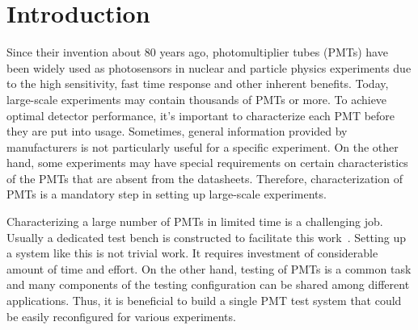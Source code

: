 \documentclass{nst}
\providecommand{\DIFadd}[1]{{\protect\color{yellow} #1}} %
\providecommand{\DIFaddbegin}{} %
\providecommand{\DIFaddend}{} %
\providecommand{\DIFdelbegin}{} %
\providecommand{\DIFdelend}{} %
\begin{document}

\maketitle


\section{Introduction}
\label{sec:introduction}

Since \DIFdelbegin \DIFdelend \DIFaddbegin \DIFadd{their invention }\DIFaddend about 80 years ago, photomultiplier tubes (PMTs) have been widely used as photosensors in nuclear and particle physics experiments due to the high sensitivity, fast time response and other \DIFdelbegin \DIFdelend \DIFaddbegin \DIFadd{inherent benefits}\DIFaddend . 
Today, \DIFdelbegin \DIFdelend \DIFaddbegin \DIFadd{large-scale }\DIFaddend experiments may contain thousands \DIFdelbegin \DIFdelend \DIFaddbegin \DIFadd{of PMTs or more. To achieve optimal detector }\DIFaddend performance, it's important to \DIFdelbegin \DIFdelend \DIFaddbegin \DIFadd{characterize }\DIFaddend each PMT before they are put into usage. 
\DIFdelbegin \DIFdelend %
\DIFaddbegin \DIFadd{Sometimes, general information provided by manufacturers is not particularly useful for a specific }\DIFaddend experiment.
On the other hand, \DIFdelbegin \DIFdelend \DIFaddbegin \DIFadd{some }\DIFaddend experiments may have special requirements \DIFdelbegin \DIFdelend \DIFaddbegin \DIFadd{on certain }\DIFaddend characteristics of the PMTs \DIFdelbegin \DIFdelend \DIFaddbegin \DIFadd{that are absent from the datasheets}\DIFaddend . 
Therefore, \DIFdelbegin \DIFdelend characterization of PMTs \DIFdelbegin \DIFdelend \DIFaddbegin \DIFadd{is a mandatory step in setting up large-scale }\DIFaddend experiments.

Characterizing a large number of PMTs in limited time is a \DIFdelbegin \DIFdelend \DIFaddbegin \DIFadd{challenging job. Usually }\DIFaddend a dedicated test bench is constructed to facilitate this work~\cite{barnhill_testing_2008,akgun_complete_2005,adragna_pmt-block_2006}.
Setting up a system like this is not \DIFdelbegin \DIFdelend \DIFaddbegin \DIFadd{trivial work. It requires investment of considerable amount of }\DIFaddend time and effort.
On the other hand, testing of PMTs is a \DIFdelbegin \DIFdelend \DIFaddbegin \DIFadd{common task }\DIFaddend and many components of the testing configuration can be shared among different applications.
\DIFaddbegin \DIFadd{Thus, it is beneficial to build a single PMT test system that could be easily reconfigured for various experiments.
}\DIFaddend 
\end{document}
